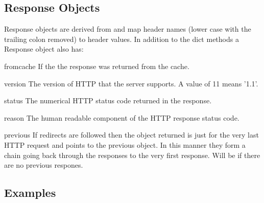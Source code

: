 \subsection{Response Objects}
\label{response-objects}

Response objects are derived from  and map
header names (lower case with the trailing colon removed)
to header values. In addition to the dict methods
a Response object also has:

\begin{memberdesc}[Response]{fromcache}
If  the the response was returned from the cache.
\end{memberdesc}

\begin{memberdesc}[Response]{version}
The version of HTTP that the server supports. A value
of 11 means '1.1'.
\end{memberdesc}

\begin{memberdesc}[Response]{status}
The numerical HTTP status code returned in the response.
\end{memberdesc}

\begin{memberdesc}[Response]{reason}
The human readable component of the HTTP response status code.
\end{memberdesc}

\begin{memberdesc}[Response]{previous}
If redirects are followed then the  object returned
is just for the very last HTTP request and  points to
the previous  object. In this manner they form a chain
going back through the responses to the very first response.
Will be  if there are no previous respones.
\end{memberdesc}







\subsection{Examples \label{httplib2-example}}

